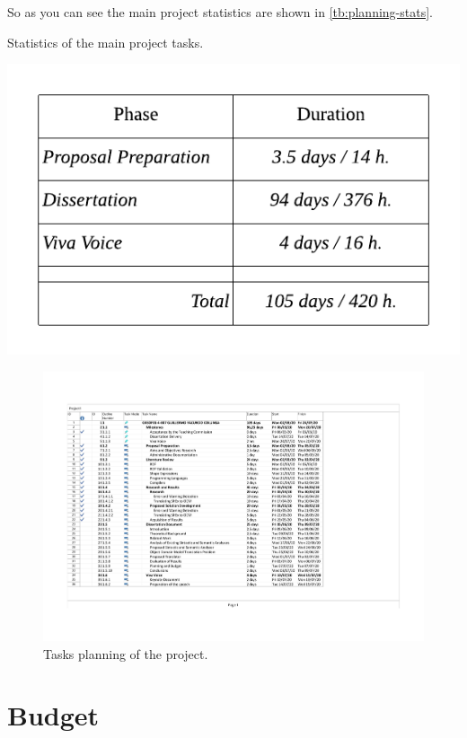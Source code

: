 \bigskip
So as you can see the main project statistics are shown in \cref{tb:planning-stats}.

\begin{table}
    \caption[Statistics of the main project tasks]{Statistics of the main project tasks.}
    \label{tb:planning-stats}
    \centering
    \includegraphics{images/planning-stats.pdf}
\end{table}

\begin{figure}
    \includegraphics[width=\textwidth]{images/planificacion.pdf}
    \centering
	\caption[Tasks planning of the project]{Tasks planning of the project.}
    \label{fig:planning-sheet}
\end{figure}

\section{Budget}